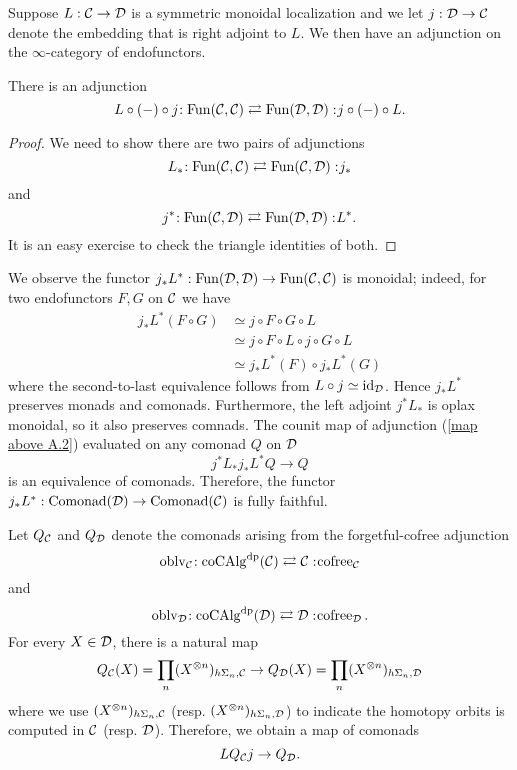 Suppose $L:{\mathcal{C}} \to {\mathcal{D}}$ is a symmetric monoidal localization
and we let $j:{\mathcal{D}} \to {\mathcal{C}}$ denote the embedding that is right adjoint to $L$.
We then have an adjunction on the $\infty$-category of endofunctors.
\begin{proposition}
\label{Prop A.4.2}
There is an adjunction
\begin{equation}
\label{A4.2 adjunction}
    L\circ (-)\circ j\negmedspace: \operatorname{Fun}({\mathcal{C}}, {\mathcal{C}})\rightleftarrows \operatorname{Fun}({\mathcal{D}}, {\mathcal{D}}):\negmedspace j\circ (-)\circ L.
\end{equation}
\end{proposition}
\begin{proof}
    We need to show there are two pairs of adjunctions
    $$
    L_{*}\negmedspace: \operatorname{Fun}({\mathcal{C}}, {\mathcal{C}})\rightleftarrows \operatorname{Fun}({\mathcal{C}}, {\mathcal{D}}):\negmedspace j_*
    $$
    and
    $$
    j^{*}\negmedspace: \operatorname{Fun}({\mathcal{C}}, {\mathcal{D}})\rightleftarrows \operatorname{Fun}({\mathcal{D}}, {\mathcal{D}}):\negmedspace L^*.
    $$
    It is an easy exercise to check the triangle identities of both.
\end{proof}


We observe the functor $j_*L^*: \operatorname{Fun}({\mathcal{D}},{\mathcal{D}}) \to \operatorname{Fun}({\mathcal{C}},{\mathcal{C}})$ is monoidal; indeed, for two endofunctors $F,G$ on ${\mathcal{C}}$ we have
\begin{align*}
    j_*L^*(F\circ G) & \simeq j\circ F \circ G \circ L\\
                     & \simeq j\circ F \circ L \circ j \circ  G \circ L \\
                     & \simeq j_*L^*(F)\circ j_*L^*(G)
\end{align*}
where the second-to-last equivalence follows from $ L \circ j \simeq \operatorname{id}_{{\mathcal{D}}}$.
Hence $j_*L^*$ preserves monads and comonads. Furthermore, the left adjoint $j^*L_*$ is oplax monoidal, so it also preserves comnads. 
The counit map of adjunction (\ref{map above A.2})  evaluated on any comonad $Q$ on ${\mathcal{D}}$
\begin{equation}
\label{map above A.2}
    j^*L_*j_*L^*Q  \to  Q
\end{equation}
is an equivalence of comonads. Therefore, the functor $j_*L^*:\operatorname{Comonad}({\mathcal{D}}) \to \operatorname{Comonad}({\mathcal{C}})$ is fully faithful.

Let $Q_{{\mathcal{C}}}$ and $Q_{{\mathcal{D}}}$ denote the comonads arising from the forgetful-cofree adjunction 
$$\operatorname{oblv}_{{\mathcal{C}}}\negmedspace: \operatorname{coCAlg}^{\operatorname{dp}}({\mathcal{C}})\rightleftarrows {\mathcal{C}}:\negmedspace \operatorname{cofree}_{{\mathcal{C}}}$$
and
$$
\operatorname{oblv}_{{\mathcal{D}}}\negmedspace: \operatorname{coCAlg}^{\operatorname{dp}}({\mathcal{D}})\rightleftarrows {\mathcal{D}}:\negmedspace \operatorname{cofree}_{{\mathcal{D}}}.
$$
For every $X\in{\mathcal{D}}$,
there is a natural map
$$
Q_{{\mathcal{C}}}(X)= \prod_{n} (X^{\otimes n})_{h\Sigma_n,{\mathcal{C}}} \to 
Q_{{\mathcal{D}}}(X)= \prod_{n} (X^{\otimes n})_{h\Sigma_n,{\mathcal{D}}}
$$
where we use $(X^{\otimes n})_{h\Sigma_n,{\mathcal{C}}}$ (resp. $(X^{\otimes n})_{h\Sigma_n,{\mathcal{D}}}$) to indicate the homotopy orbits is computed in ${\mathcal{C}}$ (resp. ${\mathcal{D}}$).
Therefore, we obtain a map of comonads 
\begin{equation}
\label{LQ_Cj to Q_D}
    LQ_{{\mathcal{C}}}j \to Q_{{\mathcal{D}}}.
\end{equation}

